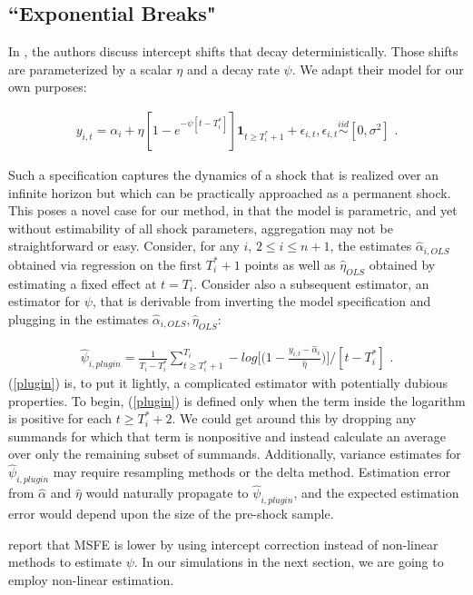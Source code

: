 \documentclass[11pt]{article}
\newcommand{\simiid}{\stackrel{iid}{\sim}} %
\theoremstyle{definition}
\begin{document}
\subsection{``Exponential Breaks"}
In \cite{castle2011forecasting}, the authors discuss intercept shifts that decay deterministically.  Those shifts are parameterized by a scalar $\eta$ and a decay rate $\psi$.  We adapt their model for our own purposes:

\begin{align}
y_{i,t} = \alpha_{i} + \eta[1 - e^{-\psi[t-T_{i}^{*}]}]\textbf{1}_{t\geq T_{i}^{*}+1} + \epsilon_{i,t}, \epsilon_{i,t} \simiid [0,\sigma^{2}] \text{ .}\label{decay_model}
\end{align}

Such a specification captures the dynamics of a shock that is realized over an infinite horizon but which can be practically approached as a permanent shock.  This poses a novel case for our method, in that the model is parametric, and yet without estimability of all shock parameters, aggregation may not be straightforward or easy.  Consider, for any $i$, $2 \leq i \leq n+1$, the estimates $\hat\alpha_{i,OLS}$  obtained via regression on the first $T_{i}^{*}+1$ points as well as $\hat\eta_{OLS}$ obtained by estimating a fixed effect at $t=T_{i}$.  Consider also a subsequent estimator, an estimator for $\psi$, that is derivable from inverting the model specification and plugging in the estimates  $\hat\alpha_{i,OLS},\hat\eta_{OLS}$:

\begin{align}
\hat\psi_{i,plugin} = \frac{1}{T_{i}-T_{i}^{*}}\sum^{T_{i}}_{t\geq T_{i}^{*}+1}-log{\big[\big(1-\frac{y_{i,t}-\hat\alpha_{i}}{\hat\eta}\big)\big]} / [t-T_{i}^{*}]\text{ .}\label{plugin}
\end{align}
(\ref{plugin}) is, to put it lightly, a complicated estimator with potentially dubious properties.  To begin, (\ref{plugin}) is defined only when the term inside the logarithm is positive for each $t\geq T^{*}_{i}+2$.  We could get around this by dropping any summands for which that term is nonpositive and instead calculate an average over only the remaining subset of summands.  Additionally, variance estimates for $\hat\psi_{i,plugin}$ may require resampling methods or the delta method.  Estimation error from $\hat\alpha$ and $\hat\eta$ would naturally propagate to $\hat\psi_{i,plugin}$, and the expected estimation error would depend upon the size of the pre-shock sample.

\cite{castle2011forecasting} report that MSFE is lower by using intercept correction instead of non-linear methods to estimate $\psi$.  In our simulations in the next section, we are going to employ non-linear estimation.
\end{document}
